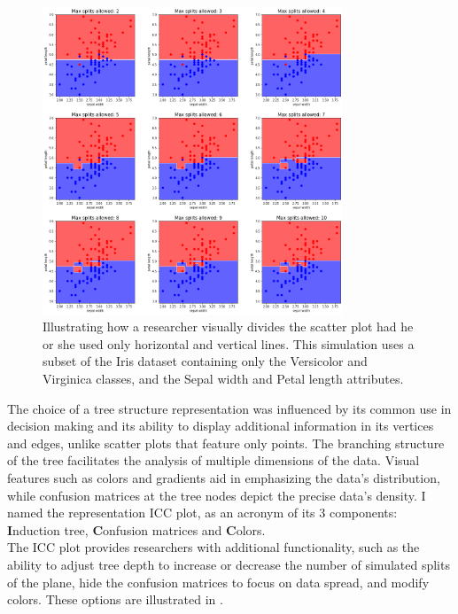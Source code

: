 \documentclass[11pt]{article}
\begin{document}
\begin{figure}[H]
\centering
\includegraphics[width=0.8\textwidth]{scatter_plot_illustration.png}

\caption{Illustrating how a researcher visually divides the scatter plot had he or she used only horizontal and vertical lines. This simulation uses a subset of the Iris dataset containing only the Versicolor and Virginica classes, and the Sepal width and Petal length attributes.}
\label{fig:fig1}

\end{figure}

The choice of a tree structure representation was influenced by its common use in decision making and its ability to display additional information in its vertices and edges, unlike scatter plots that feature only points. The branching structure of the tree facilitates the analysis of multiple dimensions of the data. Visual features such as colors and gradients aid in emphasizing the data's distribution, while confusion matrices at the tree nodes depict the precise data's density. I named the representation ICC plot, as an acronym of its 3 components: \textbf{I}nduction tree, \textbf{C}onfusion matrices and \textbf{C}olors. \\
The ICC plot provides researchers with additional functionality, such as the ability to adjust tree depth to increase or decrease the number of simulated splits of the plane, hide the confusion matrices to focus on data spread, and modify colors. These options are illustrated in .
\end{document}
